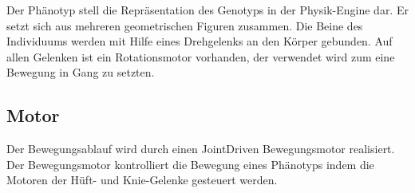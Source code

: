 
      Der Phänotyp stell die Repräsentation des Genotyps in der Physik-Engine dar.
      Er setzt sich aus mehreren geometrischen Figuren zusammen.
      Die Beine des Individuums werden mit Hilfe eines Drehgelenks an den Körper gebunden.
      Auf allen Gelenken ist ein Rotationsmotor vorhanden, der verwendet wird zum eine Bewegung in Gang zu setzten.


    \subsection{Motor\label{sub:Engine}}

      Der Bewegungsablauf wird durch einen \gls{JointDriven} Bewegungsmotor realisiert.
      Der Bewegungsmotor kontrolliert die Bewegung eines Phänotyps indem die Motoren der Hüft- und
      Knie-Gelenke gesteuert werden.

